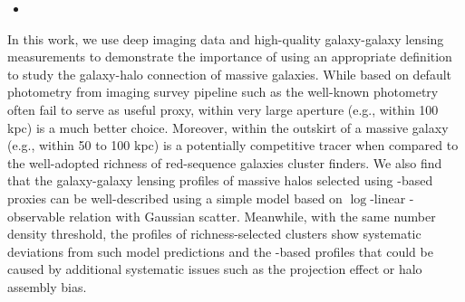 \documentclass[fleqn,usenatbib,useAMS,english]{mnras}
\begin{document}
\begin{itemize}
        \item {}

    \end{itemize}


    In this work, we use deep imaging data and high-quality galaxy-galaxy lensing measurements
    to demonstrate the importance of using an appropriate \mstar{} definition to study the
    galaxy-halo connection of massive galaxies.
    While \mstar{} based on default photometry from imaging survey pipeline such as the
    well-known \cmodel{} photometry often fail to serve as useful \mvir{} proxy, \mstar{}
    within very large aperture (e.g., within 100 kpc) is a much better choice.
    Moreover, \mstar{} within the outskirt of a massive galaxy (e.g., \mstar{} within 50 to 100 kpc)
    is a potentially competitive \mvir{} tracer when compared to the well-adopted richness of
    red-sequence galaxies cluster finders.
    We also find that the galaxy-galaxy lensing \dsigma{} profiles of massive halos selected
    using \mstar{}-based proxies can be well-described using a simple model based on $\log$-linear
    \mvir{}-observable relation with Gaussian scatter.
    Meanwhile, with the same number density threshold, the \dsigma{} profiles of richness-selected
    clusters show systematic deviations from such model predictions and the \mstar{}-based profiles
    that could be caused by additional systematic issues such as the projection effect or
    halo assembly bias.

\end{document}

